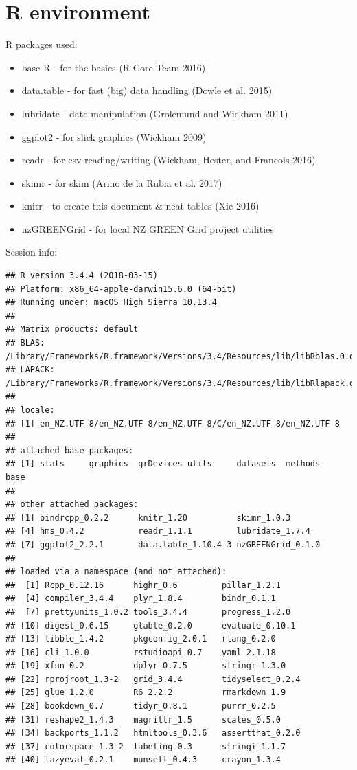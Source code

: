 \documentclass[]{article}
\providecommand{\tightlist}{%
  \setlength{\itemsep}{0pt}\setlength{\parskip}{0pt}}
\begin{document}
\section{R environment}\label{r-environment}

R packages used:

\begin{itemize}
\tightlist
\item
  base R - for the basics (R Core Team 2016)
\item
  data.table - for fast (big) data handling (Dowle et al. 2015)
\item
  lubridate - date manipulation (Grolemund and Wickham 2011)
\item
  ggplot2 - for slick graphics (Wickham 2009)
\item
  readr - for csv reading/writing (Wickham, Hester, and Francois 2016)
\item
  skimr - for skim (Arino de la Rubia et al. 2017)
\item
  knitr - to create this document \& neat tables (Xie 2016)
\item
  nzGREENGrid - for local NZ GREEN Grid project utilities
\end{itemize}

Session info:

\begin{verbatim}
## R version 3.4.4 (2018-03-15)
## Platform: x86_64-apple-darwin15.6.0 (64-bit)
## Running under: macOS High Sierra 10.13.4
## 
## Matrix products: default
## BLAS: /Library/Frameworks/R.framework/Versions/3.4/Resources/lib/libRblas.0.dylib
## LAPACK: /Library/Frameworks/R.framework/Versions/3.4/Resources/lib/libRlapack.dylib
## 
## locale:
## [1] en_NZ.UTF-8/en_NZ.UTF-8/en_NZ.UTF-8/C/en_NZ.UTF-8/en_NZ.UTF-8
## 
## attached base packages:
## [1] stats     graphics  grDevices utils     datasets  methods   base     
## 
## other attached packages:
## [1] bindrcpp_0.2.2      knitr_1.20          skimr_1.0.3        
## [4] hms_0.4.2           readr_1.1.1         lubridate_1.7.4    
## [7] ggplot2_2.2.1       data.table_1.10.4-3 nzGREENGrid_0.1.0  
## 
## loaded via a namespace (and not attached):
##  [1] Rcpp_0.12.16      highr_0.6         pillar_1.2.1     
##  [4] compiler_3.4.4    plyr_1.8.4        bindr_0.1.1      
##  [7] prettyunits_1.0.2 tools_3.4.4       progress_1.2.0   
## [10] digest_0.6.15     gtable_0.2.0      evaluate_0.10.1  
## [13] tibble_1.4.2      pkgconfig_2.0.1   rlang_0.2.0      
## [16] cli_1.0.0         rstudioapi_0.7    yaml_2.1.18      
## [19] xfun_0.2          dplyr_0.7.5       stringr_1.3.0    
## [22] rprojroot_1.3-2   grid_3.4.4        tidyselect_0.2.4 
## [25] glue_1.2.0        R6_2.2.2          rmarkdown_1.9    
## [28] bookdown_0.7      tidyr_0.8.1       purrr_0.2.5      
## [31] reshape2_1.4.3    magrittr_1.5      scales_0.5.0     
## [34] backports_1.1.2   htmltools_0.3.6   assertthat_0.2.0 
## [37] colorspace_1.3-2  labeling_0.3      stringi_1.1.7    
## [40] lazyeval_0.2.1    munsell_0.4.3     crayon_1.3.4
\end{verbatim}
\end{document}
